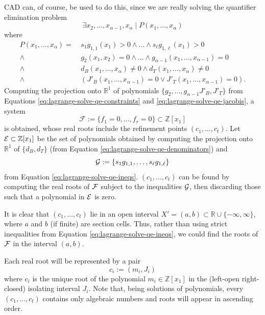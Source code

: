 \documentclass[
]{book}
\theoremstyle{definition}
\theoremstyle{definition}
\theoremstyle{definition}
\theoremstyle{definition}
\theoremstyle{remark}
\begin{document}
CAD can, of course, be used to do this, since we are really solving the quantifier elimination problem
\[
\exists x_2,\ldots,x_{\alpha - 1},x_\alpha \mid P(x_1,\ldots,x_\alpha)
\] where
\begin{align}
P(x_1,\ldots,x_\alpha) =\ & s_1 g_{1,1}(x_1) > 0 \land \ldots \land s_\ell g_{1,\ell}(x_1) > 0
\label{eq:lagrange-solve-qe-ineqs} \\
\land\ & g_2(x_1,x_2) = 0 \land \ldots \land g_{\alpha - 1}(x_1,\ldots,x_{\alpha - 1}) = 0
\label{eq:lagrange-solve-qe-constraints} \\
\land\ & d_B(x_1,\ldots,x_\alpha) \ne 0 \land d_T(x_1,\ldots,x_\alpha) \ne 0
\label{eq:lagrange-solve-qe-denominators} \\
\land\ & ( J'_B(x_1,\ldots,x_{\alpha - 1}) = 0 \lor J'_T(x_1,\ldots,x_{\alpha - 1}) = 0 ).
\label{eq:lagrange-solve-qe-jacobis}
\end{align}
Computing the projection onto \(\mathbb{R}^1\) of polynomials \(\{g_2,\ldots,g_{\alpha - 1} J'_B, J'_T \}\) from Equations \eqref{eq:lagrange-solve-qe-constraints} and \eqref{eq:lagrange-solve-qe-jacobis}, a system
\begin{equation}
\mathcal{F} := \{ f_1=0 ,\ldots,f_r=0 \} \subset \mathbb{Z}[x_1]
\label{eq:lagrange-solve-projected}
\end{equation}
is obtained, whose real roots include the refinement points \((c_1,\ldots,c_t)\).
Let \({\cal E} \subset \mathbb{Z}[x_1]\) be the set of polynomials obtained by computing the projection onto \(\mathbb{R}^1\) of \(\{ d_B, d_T \}\) (from Equation \eqref{eq:lagrange-solve-qe-denominators}) and
\[{\cal G} := \{ s_1 g_{1,1}, \ldots, s_\ell g_{1,\ell} \}
\]
from Equation \eqref{eq:lagrange-solve-qe-ineqs}.
\((c_1,\ldots,c_t)\) can be found by computing the real roots of \(\cal F\) subject to the inequalities \(\cal G\), then discarding those such that a polynomial in \(\cal E\) is zero.

It is clear that \((c_1,\ldots,c_t)\) lie in an open interval \(X' = (a,b) \subset \mathbb{R}\cup \{ -\infty, \infty \}\), where \(a\) and \(b\) (if finite) are section cells. Thus, rather than using strict inequalities from Equation \eqref{eq:lagrange-solve-qe-ineqs}, we could find the roots of \(\cal F\) in the interval \((a,b)\).

Each real root will be represented by a pair
\begin{equation}
c_i := (m_i,J_i)
\label{eq:algebraic-number}
\end{equation}
where \(c_i\) is the unique root of the polynomial \(m_i \in \mathbb{Z}[x_1]\) in the (left-open right-closed) isolating interval \(J_i\).
Note that, being solutions of polynomials, every \((c_1,\ldots,c_t)\) contains only algebraic numbers and roots will appear in ascending order.
\end{document}

